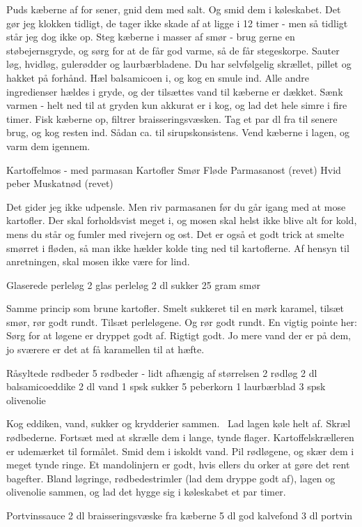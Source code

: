 \documentclass[
  letterpaper,
  DIV=11,
  numbers=noendperiod]{scrreprt}
\begin{document}
Puds kæberne af for sener, gnid dem med salt. Og smid dem i køleskabet.
Det gør jeg klokken tidligt, de tager ikke skade af at ligge i 12 timer
- men så tidligt står jeg dog ikke op. Steg kæberne i masser af smør -
brug gerne en støbejernsgryde, og sørg for at de får god varme, så de
får stegeskorpe. Sauter løg, hvidløg, gulerødder og laurbærbladene. Du
har selvfølgelig skrællet, pillet og hakket på forhånd. Hæl balsamicoen
i, og kog en smule ind. Alle andre ingredienser hældes i gryde, og der
tilsættes vand til kæberne er dækket. Sænk varmen - helt ned til at
gryden kun akkurat er i kog, og lad det hele simre i fire timer. Fisk
kæberne op, filtrer braisseringsvæsken. Tag et par dl fra til senere
brug, og kog resten ind. Sådan ca. til sirupskonsistens. Vend kæberne i
lagen, og varm dem igennem.

Kartoffelmos - med parmasan Kartofler Smør Fløde Parmasanost (revet)
Hvid peber Muskatnød (revet)

Det gider jeg ikke udpensle. Men riv parmasanen før du går igang med at
mose kartofler. Der skal forholdsvist meget i, og mosen skal helst ikke
blive alt for kold, mens du står og fumler med rivejern og ost. Det er
også et godt trick at smelte smørret i fløden, så man ikke hælder kolde
ting ned til kartoflerne. Af hensyn til anretningen, skal mosen ikke
være for lind.

Glaserede perleløg 2 glas perleløg 2 dl sukker 25 gram smør

Samme princip som brune kartofler. Smelt sukkeret til en mørk karamel,
tilsæt smør, rør godt rundt. Tilsæt perleløgene. Og rør godt rundt. En
vigtig pointe her: Sørg for at løgene er dryppet godt af. Rigtigt godt.
Jo mere vand der er på dem, jo sværere er det at få karamellen til at
hæfte.

Råsyltede rødbeder 5 rødbeder - lidt afhængig af størrelsen 2 rødløg 2
dl balsamicoeddike 2 dl vand 1 spsk sukker 5 peberkorn 1 laurbærblad 3
spsk olivenolie

Kog eddiken, vand, sukker og krydderier sammen.~ Lad lagen køle helt af.
Skræl rødbederne. Fortsæt med at skrælle dem i lange, tynde flager.
Kartoffelskrælleren er udemærket til formålet. Smid dem i iskoldt vand.
Pil rødløgene, og skær dem i meget tynde ringe. Et mandolinjern er godt,
hvis ellers du orker at gøre det rent bagefter. Bland løgringe,
rødbedestrimler (lad dem dryppe godt af), lagen og olivenolie sammen, og
lad det hygge sig i køleskabet et par timer.

Portvinssauce 2 dl braisseringsvæske fra kæberne 5 dl god kalvefond 3 dl
portvin
\end{document}
